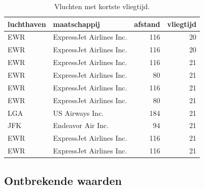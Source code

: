 \documentclass[]{tufte-book}
\begin{document}
\begin{table}

\caption{\label{tab:5-13b}Vluchten met kortste vliegtijd.}
\centering
\fontsize{10}{12}\selectfont
\begin{tabular}[t]{llrr}
\toprule
luchthaven & maatschappij & afstand & vliegtijd\\
\midrule
EWR & ExpressJet Airlines Inc. & 116 & 20\\
EWR & ExpressJet Airlines Inc. & 116 & 20\\
EWR & ExpressJet Airlines Inc. & 116 & 21\\
EWR & ExpressJet Airlines Inc. & 80 & 21\\
EWR & ExpressJet Airlines Inc. & 116 & 21\\
\addlinespace
EWR & ExpressJet Airlines Inc. & 80 & 21\\
LGA & US Airways Inc. & 184 & 21\\
JFK & Endeavor Air Inc. & 94 & 21\\
EWR & ExpressJet Airlines Inc. & 116 & 21\\
EWR & ExpressJet Airlines Inc. & 116 & 21\\
\bottomrule
\end{tabular}
\end{table}

\hypertarget{ontbrekende-waarden}{%
\subsection{Ontbrekende waarden}\label{ontbrekende-waarden}}
\end{document}
